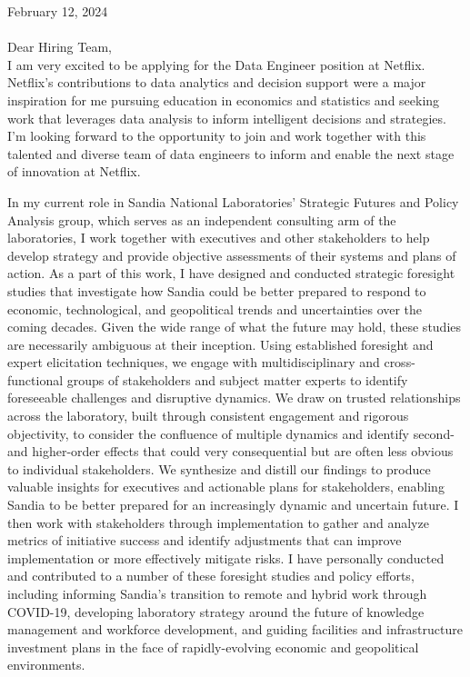 \documentclass[10pt]{article}
\begin{document}
	

\noindent February 12, 2024\\\\
\noindent Dear Hiring Team,\\

I am very excited to be applying for the Data Engineer position at Netflix. Netflix's contributions to data analytics and decision support were a major inspiration for me pursuing education in economics and statistics and seeking work that leverages data analysis to inform intelligent decisions and strategies. I'm looking forward to the opportunity to join and work together with this talented and diverse team of data engineers to inform and enable the next stage of innovation at Netflix. 

In my current role in Sandia National Laboratories' Strategic Futures and Policy Analysis group, which serves as an independent consulting arm of the laboratories, I work together with executives and other stakeholders to help develop strategy and provide objective assessments of their systems and plans of action. As a part of this work, I have designed and conducted strategic foresight studies that investigate how Sandia could be better prepared to respond to economic, technological, and geopolitical trends and uncertainties over the coming decades. Given the wide range of what the future may hold, these studies are necessarily ambiguous at their inception. Using established foresight and expert elicitation techniques, we engage with multidisciplinary and cross-functional groups of stakeholders and subject matter experts to identify foreseeable challenges and disruptive dynamics. We draw on trusted relationships across the laboratory, built through consistent engagement and rigorous objectivity, to consider the confluence of multiple dynamics and identify second- and higher-order effects that could very consequential but are often less obvious to individual stakeholders. We synthesize and distill our findings to produce valuable insights for executives and actionable plans for stakeholders, enabling Sandia to be better prepared for an increasingly dynamic and uncertain future. I then work with stakeholders through implementation to gather and analyze metrics of initiative success and identify adjustments that can improve implementation or more effectively mitigate risks. I have personally conducted and contributed to a number of these foresight studies and policy efforts, including informing Sandia's transition to remote and hybrid work through COVID-19, developing laboratory strategy around the future of knowledge management and workforce development, and guiding facilities and infrastructure investment plans in the face of rapidly-evolving economic and geopolitical environments.
\end{document}
